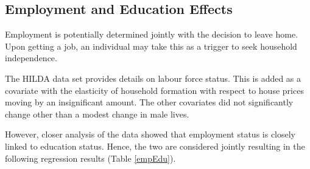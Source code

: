 \documentclass[12pt]{article}
\begin{document}
\subsection{Employment and Education Effects}

Employment is potentially determined jointly with the decision to leave home. Upon getting a job, an individual may take this as a trigger to seek household independence.

The HILDA data set provides details on labour force status. This is added as a covariate with the elasticity of household formation with respect to house prices moving by an insignificant amount. The other covariates did not significantly change other than a modest change in male lives.

However, closer analysis of the data showed that employment status is closely linked to education status. Hence, the two are considered jointly resulting in the following regression results (Table \ref{empEdu}).
\end{document}
